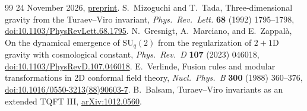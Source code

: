 \documentclass[11pt]{article}
\theoremstyle{remark}
\begin{document}
\begin{thebibliography}{99}
24 November 2026,
\href{https://mathcommunity.github.io/oai-math-revised/papers/Euclidean-geometry-in-the-asymptotic-spectrum-of-tensors-November-24-2026/}{preprint}.
S.~Mizoguchi and T.~Tada, Three-dimensional gravity from the Turaev--Viro invariant,
\emph{Phys.\ Rev.\ Lett.} \textbf{68} (1992) 1795--1798,
\href{https://doi.org/10.1103/PhysRevLett.68.1795}{doi:10.1103/PhysRevLett.68.1795}.
N.~Gresnigt, A.~Marciano, and E.~Zappal\`a,
On the dynamical emergence of \(\mathrm{SU}_q(2)\) from the regularization of \(2+1\)D gravity with cosmological constant,
\emph{Phys.\ Rev.\ D} \textbf{107} (2023) 046018,
\href{https://doi.org/10.1103/PhysRevD.107.046018}{doi:10.1103/PhysRevD.107.046018}.
E.~Verlinde, Fusion rules and modular transformations in 2D conformal field theory,
\emph{Nucl.\ Phys.\ B} \textbf{300} (1988) 360--376,
\href{https://doi.org/10.1016/0550-3213(88)90603-7}{doi:10.1016/0550-3213(88)90603-7}.
B.~Balsam, Turaev--Viro invariants as an extended TQFT III,
\href{https://arxiv.org/abs/1012.0560}{arXiv:1012.0560}.
\end{thebibliography}
\end{document}
